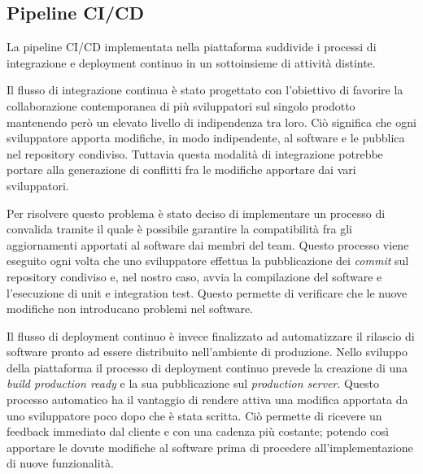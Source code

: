 \subsection{Pipeline CI/CD}
La pipeline CI/CD implementata nella piattaforma suddivide i processi di integrazione e deployment continuo
in un sottoinsieme di attività distinte.

Il flusso di integrazione continua è stato progettato con l'obiettivo di favorire la collaborazione
contemporanea di più sviluppatori sul singolo prodotto mantenendo però un elevato livello di indipendenza
tra loro. Ciò significa che ogni sviluppatore apporta modifiche, in modo indipendente, al software
e le pubblica nel repository condiviso. Tuttavia questa modalità di integrazione
potrebbe portare alla generazione di conflitti fra le modifiche apportare dai vari sviluppatori.

Per risolvere questo problema è stato deciso di implementare un processo di convalida
tramite il quale è possibile garantire la compatibilità fra gli aggiornamenti apportati al software dai membri
del team.
Questo processo viene eseguito ogni volta che uno sviluppatore effettua la pubblicazione dei \textit{commit} sul repository
condiviso e, nel nostro caso, avvia la compilazione del software e l'esecuzione  di unit e integration test.
Questo permette di verificare che le nuove modifiche non introducano problemi nel software.

Il flusso di deployment continuo è invece finalizzato ad automatizzare il rilascio di software pronto ad essere
distribuito nell'ambiente di produzione.
Nello sviluppo della piattaforma il processo di deployment continuo prevede la creazione di una \textit{build production ready}
e la sua pubblicazione sul \textit{production server}. Questo processo automatico ha il vantaggio di rendere
attiva una modifica apportata da uno sviluppatore poco dopo che è stata scritta. Ciò permette di ricevere un
feedback immediato dal cliente e con una cadenza più costante; potendo così apportare
le dovute modifiche al software prima di procedere all'implementazione di nuove funzionalità.

